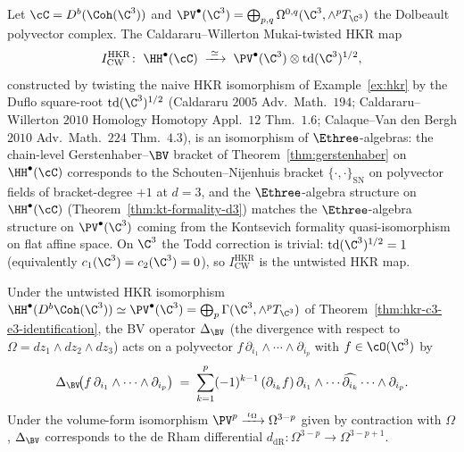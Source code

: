 \begin{theorem}
\label{thm:hkr-c3-e3-identification}
Let $\cC=D^b(\Coh(\C^3))$ and $\PV^\bullet(\C^3)=\bigoplus_{p,q}
\Omega^{0,q}(\C^3,\wedge^p T_{\C^3})$ the Dolbeault polyvector complex.
The Caldararu--Willerton Mukai-twisted HKR map
\begin{equation}
\label{eq:hkr-c3-twisted}
 I_{\mathrm{CW}}^{\mathrm{HKR}}\colon\;
 \HH^\bullet(\cC)\;\xrightarrow{\;\simeq\;}\;
 \PV^\bullet(\C^3)\otimes\mathrm{td}(\C^3)^{1/2},
\end{equation}
constructed by twisting the naive HKR isomorphism of
Example~\ref{ex:hkr} by the Duflo square-root
$\mathrm{td}(\C^3)^{1/2}$ (Caldararu $2005$ Adv.\ Math.\ $194$;
Caldararu--Willerton $2010$ Homology Homotopy Appl.\ $12$ Thm.~$1.6$;
Calaque--Van den Bergh $2010$ Adv.\ Math.\ $224$ Thm.~$4.3$), is an
isomorphism of $\Ethree$-algebras: the chain-level Gerstenhaber--$\BV$
bracket of Theorem~\ref{thm:gerstenhaber} on $\HH^\bullet(\cC)$
corresponds to the Schouten--Nijenhuis bracket
$\{\cdot,\cdot\}_{\mathrm{SN}}$ on polyvector fields of bracket-degree
$+1$ at $d=3$, and the $\Ethree$-algebra structure on
$\HH^\bullet(\cC)$ (Theorem~\ref{thm:kt-formality-d3}) matches the
$\Ethree$-algebra structure on $\PV^\bullet(\C^3)$ coming from the
Kontsevich formality quasi-isomorphism on flat affine space. On $\C^3$
the Todd correction is trivial: $\mathrm{td}(\C^3)^{1/2}=1$
(equivalently $c_1(\C^3)=c_2(\C^3)=0$), so
$I_{\mathrm{CW}}^{\mathrm{HKR}}$ is the untwisted HKR map.
\end{theorem}

\begin{lemma}
\label{lem:bv-c3-explicit}
Under the untwisted HKR isomorphism
$\HH^\bullet(D^b\Coh(\C^3)) \simeq \PV^\bullet(\C^3) = \bigoplus_p \Gamma(\C^3, \wedge^p T_{\C^3})$
of Theorem~\ref{thm:hkr-c3-e3-identification}, the BV operator
$\Delta_{\BV}$ (the divergence with respect to
$\Omega = dz_1 \wedge dz_2 \wedge dz_3$) acts on a polyvector
$f\, \partial_{i_1} \wedge \cdots \wedge \partial_{i_p}$ with
$f \in \cO(\C^3)$ by
\[
 \Delta_{\BV}\!\bigl(f\, \partial_{i_1} \wedge \cdots \wedge \partial_{i_p}\bigr)
 \;=\; \sum_{k=1}^{p} (-1)^{k-1}\, (\partial_{i_k} f)\, \partial_{i_1} \wedge \cdots \widehat{\partial_{i_k}} \cdots \wedge \partial_{i_p}.
\]
Under the volume-form isomorphism $\PV^p \xrightarrow{\;\iota_\Omega\;} \Omega^{3 - p}$ given by contraction with $\Omega$, $\Delta_{\BV}$ corresponds to the de Rham differential
$d_{\mathrm{dR}} \colon \Omega^{3 - p} \to \Omega^{3 - p + 1}$.
\end{lemma}

